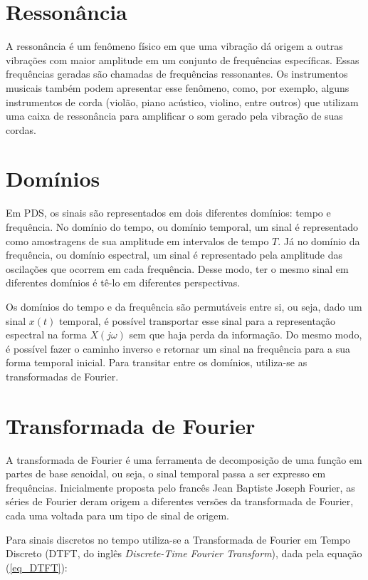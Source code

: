 \section{Ressonância}


A ressonância é um fenômeno físico em que uma vibração dá origem a outras vibrações com maior amplitude em um conjunto de frequências específicas. Essas frequências geradas são chamadas de frequências ressonantes. Os instrumentos musicais também podem apresentar esse fenômeno, como, por exemplo, alguns instrumentos de corda (violão, piano acústico, violino, entre outros) que utilizam uma caixa de ressonância para amplificar o som gerado pela vibração de suas cordas.


\section{Domínios}

Em PDS, os sinais são representados em dois diferentes domínios: tempo e frequência. No domínio do tempo, ou domínio temporal, um sinal é representado como amostragens de sua amplitude em intervalos de tempo $T$. Já no domínio da frequência, ou domínio espectral, um sinal é representado pela amplitude das oscilações que ocorrem em cada frequência. Desse modo, ter o mesmo sinal em diferentes domínios é tê-lo em diferentes perspectivas.


Os domínios do tempo e da frequência são permutáveis entre si, ou seja, dado um sinal $x(t)$ temporal, é possível transportar esse sinal para a representação espectral na forma $X(j\omega)$ sem que haja perda da informação. Do mesmo modo, é possível fazer o caminho inverso e retornar um sinal na frequência para a sua forma temporal inicial. Para transitar entre os domínios, utiliza-se as transformadas de Fourier.

\section{Transformada de Fourier}

A transformada de Fourier é uma ferramenta de decomposição de uma função em partes de base senoidal, ou seja, o sinal temporal passa a ser expresso em frequências. Inicialmente proposta pelo francês Jean Baptiste Joseph Fourier\cite{open1999}, as séries de Fourier deram origem a diferentes versões da transformada de Fourier, cada uma voltada para um tipo de sinal de origem.



Para sinais discretos no tempo utiliza-se a Transformada de Fourier em Tempo Discreto (DTFT, do inglês \textit{Discrete-Time Fourier Transform}), dada pela equação (\ref{eq_DTFT}):

